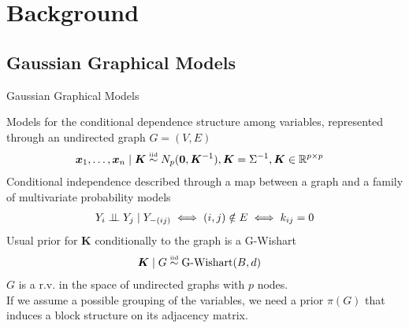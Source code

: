 

\section{Background}

\subsection{Gaussian Graphical Models}
\begin{frame}{Gaussian Graphical Models}

    Models for the \alert{conditional dependence structure} among variables, represented through an undirected graph $G=(V,E)$
    \begin{align*}
    \bm{x}_{1}, \ldots, \bm{x}_{n} \mid \bm{K} &\iid N_{p}(\bm{0},\bm{K}^{-1}), \bm{K}=\Sigma^{-1}, \bm{K} \in \mathbb{R}^{p\times p}  %
    \end{align*}
Conditional independence described through a \alert{map} between a \alert{graph} and a family of multivariate \alert{probability models}
\begin{align*}
Y_{i}\perp \!\!\! \perp Y_{j} \mid Y_{-(ij)} \iff (i,j) \notin E \iff k_{ij}=0
\end{align*}
Usual prior for $\bm{K}$ conditionally to the graph is a G-Wishart
\begin{align*}
    \bm{K} \mid G &\overset{\text{\tiny{iid}}}{\sim} \operatorname{G-Wishart}(B,d)
\end{align*}
$G$ is a r.v. in the space of undirected graphs with $p$ nodes.\\
If we assume a possible \alert{grouping} of the variables, we need a prior $\pi(G)$ that induces a \alert{block structure on its adjacency matrix}.
\end{frame}



 

